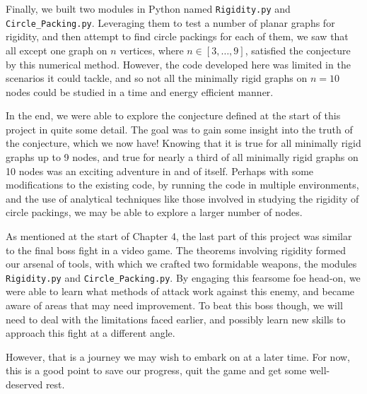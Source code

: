 \begin{flushleft}
Finally, we built two modules in Python named \texttt{Rigidity.py} and \texttt{Circle\_Packing.py}. Leveraging them to test a number of planar graphs for rigidity, and then attempt to find circle packings for each of them, we saw that all except one graph on $n$ vertices, where $n \in [3, \hdots, 9]$, satisfied the conjecture by this numerical method. However, the code developed here was limited in the scenarios it could tackle, and so not all the minimally rigid graphs on $n = 10$ nodes could be studied in a time and energy efficient manner. 
\end{flushleft}

\begin{flushleft}
In the end, we were able to explore the conjecture defined at the start of this project in quite some detail. The goal was to gain some insight into the truth of the conjecture, which we now have! Knowing that it is true for all minimally rigid graphs up to 9 nodes, and true for nearly a third of all minimally rigid graphs on 10 nodes was an exciting adventure in and of itself. Perhaps with some modifications to the existing code, by running the code in multiple environments, and the use of analytical techniques like those involved in studying the rigidity of circle packings, we may be able to explore a larger number of nodes. 
\end{flushleft}

\begin{flushleft}
As mentioned at the start of Chapter 4, the last part of this project was similar to the final boss fight in a video game. The theorems involving rigidity formed our arsenal of tools, with which we crafted two formidable weapons, the modules \texttt{Rigidity.py} and \texttt{Circle\_Packing.py}. By engaging this fearsome foe head-on, we were able to learn what methods of attack work against this enemy, and became aware of areas that may need improvement. To beat this boss though, we will need to deal with the limitations faced earlier, and possibly learn new skills to approach this fight at a different angle.
\end{flushleft}

\begin{flushleft}
However, that is a journey we may wish to embark on at a later time. For now, this is a good point to save our progress, quit the game and get some well-deserved rest. 
\end{flushleft}